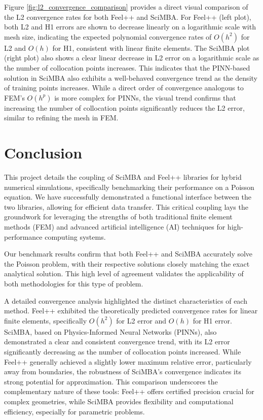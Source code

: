 \documentclass{article}
\begin{document}
Figure \ref{fig:l2_convergence_comparison} provides a direct visual comparison of the L2 convergence rates for both Feel++ and SciMBA. For Feel++ (left plot), both L2 and H1 errors are shown to decrease linearly on a logarithmic scale with mesh size, indicating the expected polynomial convergence rates of $O(h^2)$ for L2 and $O(h)$ for H1, consistent with linear finite elements. The SciMBA plot (right plot) also shows a clear linear decrease in L2 error on a logarithmic scale as the number of collocation points increases. This indicates that the PINN-based solution in SciMBA also exhibits a well-behaved convergence trend as the density of training points increases. While a direct order of convergence analogous to FEM's $O(h^p)$ is more complex for PINNs, the visual trend confirms that increasing the number of collocation points significantly reduces the L2 error, similar to refining the mesh in FEM.

\section{Conclusion}

This project details the coupling of SciMBA and Feel++ libraries for hybrid numerical simulations, specifically benchmarking their performance on a Poisson equation. We have successfully demonstrated a functional interface between the two libraries, allowing for efficient data transfer. This critical coupling lays the groundwork for leveraging the strengths of both traditional finite element methods (FEM) and advanced artificial intelligence (AI) techniques for high-performance computing systems.

Our benchmark results confirm that both Feel++ and SciMBA accurately solve the Poisson problem, with their respective solutions closely matching the exact analytical solution. This high level of agreement validates the applicability of both methodologies for this type of problem.

A detailed convergence analysis highlighted the distinct characteristics of each method. Feel++ exhibited the theoretically predicted convergence rates for linear finite elements, specifically $O(h^2)$ for L2 error and $O(h)$ for H1 error. SciMBA, based on Physics-Informed Neural Networks (PINNs), also demonstrated a clear and consistent convergence trend, with its L2 error significantly decreasing as the number of collocation points increased. While Feel++ generally achieved a slightly lower maximum relative error, particularly away from boundaries, the robustness of SciMBA's convergence indicates its strong potential for approximation. This comparison underscores the complementary nature of these tools: Feel++ offers certified precision crucial for complex geometries, while SciMBA provides flexibility and computational efficiency, especially for parametric problems.
\end{document}
